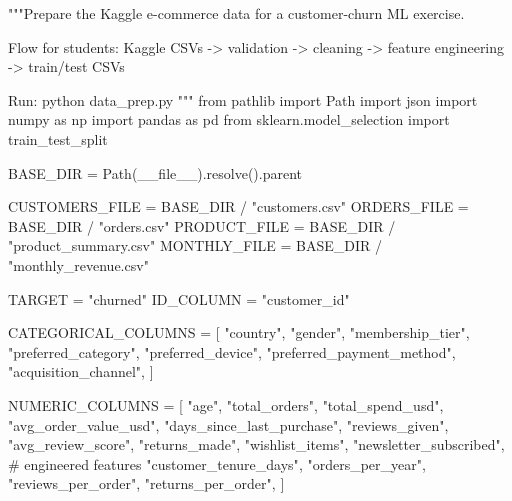 \documentclass[
  indonesian,
  letterpaper,
  DIV=11,
  numbers=noendperiod]{scrreprt}
\newenvironment{Shaded}{\begin{snugshade}}{\end{snugshade}}
\newcommand{\CommentTok}[1]{\textcolor[rgb]{0.37,0.37,0.37}{#1}}
\newcommand{\ImportTok}[1]{\textcolor[rgb]{0.00,0.46,0.62}{#1}}
\newcommand{\NormalTok}[1]{\textcolor[rgb]{0.00,0.23,0.31}{#1}}
\newcommand{\OperatorTok}[1]{\textcolor[rgb]{0.37,0.37,0.37}{#1}}
\newcommand{\StringTok}[1]{\textcolor[rgb]{0.13,0.47,0.30}{#1}}
\newcommand{\VariableTok}[1]{\textcolor[rgb]{0.07,0.07,0.07}{#1}}
\begin{document}
\begin{Shaded}
\begin{Highlighting}[]
\CommentTok{"""Prepare the Kaggle e{-}commerce data for a customer{-}churn ML exercise.}

\CommentTok{Flow for students:}
\CommentTok{    Kaggle CSVs {-}\textgreater{} validation {-}\textgreater{} cleaning {-}\textgreater{} feature engineering {-}\textgreater{} train/test CSVs}

\CommentTok{Run:}
\CommentTok{    python data\_prep.py}
\CommentTok{"""}
\ImportTok{from}\NormalTok{ pathlib }\ImportTok{import}\NormalTok{ Path}
\ImportTok{import}\NormalTok{ json}
\ImportTok{import}\NormalTok{ numpy }\ImportTok{as}\NormalTok{ np}
\ImportTok{import}\NormalTok{ pandas }\ImportTok{as}\NormalTok{ pd}
\ImportTok{from}\NormalTok{ sklearn.model\_selection }\ImportTok{import}\NormalTok{ train\_test\_split}

\NormalTok{BASE\_DIR }\OperatorTok{=}\NormalTok{ Path(}\VariableTok{\_\_file\_\_}\NormalTok{).resolve().parent}

\NormalTok{CUSTOMERS\_FILE }\OperatorTok{=}\NormalTok{ BASE\_DIR }\OperatorTok{/} \StringTok{"customers.csv"}
\NormalTok{ORDERS\_FILE }\OperatorTok{=}\NormalTok{ BASE\_DIR }\OperatorTok{/} \StringTok{"orders.csv"}
\NormalTok{PRODUCT\_FILE }\OperatorTok{=}\NormalTok{ BASE\_DIR }\OperatorTok{/} \StringTok{"product\_summary.csv"}
\NormalTok{MONTHLY\_FILE }\OperatorTok{=}\NormalTok{ BASE\_DIR }\OperatorTok{/} \StringTok{"monthly\_revenue.csv"}

\NormalTok{TARGET }\OperatorTok{=} \StringTok{"churned"}
\NormalTok{ID\_COLUMN }\OperatorTok{=} \StringTok{"customer\_id"}

\NormalTok{CATEGORICAL\_COLUMNS }\OperatorTok{=}\NormalTok{ [}
    \StringTok{"country"}\NormalTok{,}
    \StringTok{"gender"}\NormalTok{,}
    \StringTok{"membership\_tier"}\NormalTok{,}
    \StringTok{"preferred\_category"}\NormalTok{,}
    \StringTok{"preferred\_device"}\NormalTok{,}
    \StringTok{"preferred\_payment\_method"}\NormalTok{,}
    \StringTok{"acquisition\_channel"}\NormalTok{,}
\NormalTok{]}

\NormalTok{NUMERIC\_COLUMNS }\OperatorTok{=}\NormalTok{ [}
    \StringTok{"age"}\NormalTok{,}
    \StringTok{"total\_orders"}\NormalTok{,}
    \StringTok{"total\_spend\_usd"}\NormalTok{,}
    \StringTok{"avg\_order\_value\_usd"}\NormalTok{,}
    \StringTok{"days\_since\_last\_purchase"}\NormalTok{,}
    \StringTok{"reviews\_given"}\NormalTok{,}
    \StringTok{"avg\_review\_score"}\NormalTok{,}
    \StringTok{"returns\_made"}\NormalTok{,}
    \StringTok{"wishlist\_items"}\NormalTok{,}
    \StringTok{"newsletter\_subscribed"}\NormalTok{,}
    \CommentTok{\# engineered features}
    \StringTok{"customer\_tenure\_days"}\NormalTok{,}
    \StringTok{"orders\_per\_year"}\NormalTok{,}
    \StringTok{"reviews\_per\_order"}\NormalTok{,}
    \StringTok{"returns\_per\_order"}\NormalTok{,}
\NormalTok{]}


\end{Highlighting}
\end{Shaded}
\end{document}
